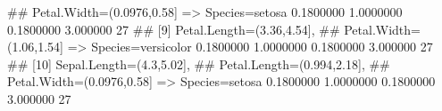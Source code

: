\begin{Schunk}
\begin{Soutput}
{##       Petal.Width=(0.0976,0.58]} => {Species=setosa}     0.1800000  1.0000000 0.1800000 3.000000    27
## [9]  {Petal.Length=(3.36,4.54],                                                                       
##       Petal.Width=(1.06,1.54]}   => {Species=versicolor} 0.1800000  1.0000000 0.1800000 3.000000    27
## [10] {Sepal.Length=(4.3,5.02],                                                                        
##       Petal.Length=(0.994,2.18],                                                                      
##       Petal.Width=(0.0976,0.58]} => {Species=setosa}     0.1800000  1.0000000 0.1800000 3.000000    27
\end{Soutput}
%
% --end: "casestudy-assoc-arules"
\end{Schunk}
